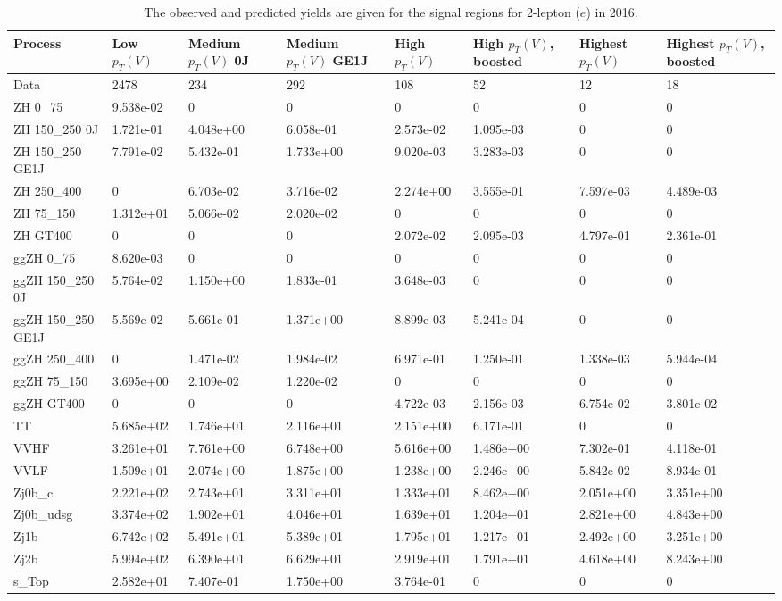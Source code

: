 \begin{table}
\centering
\caption[2016 2-lepton ($e$) signal selection yields]{
                  The observed and predicted yields are given for the
                  signal regions for 2-lepton ($e$) in 2016.
                  }
{\footnotesize
\begin{tabularx}{\textwidth}{|X|X|X|X|X|X|X|X|}
\hline
Process & Low $p_{T}(V)$ & Medium $p_{T}(V)$ 0J & Medium $p_{T}(V)$ GE1J & High $p_{T}(V)$ & High $p_{T}(V)$, boosted & Highest $p_{T}(V)$ & Highest $p_{T}(V)$, boosted \\
\hline
Data & 2478 & 234 & 292 & 108 & 52 & 12 & 18 \\
\hline
ZH 0\_75 & 9.538e-02 & 0 & 0 & 0 & 0 & 0 & 0 \\
ZH 150\_250 0J & 1.721e-01 & 4.048e+00 & 6.058e-01 & 2.573e-02 & 1.095e-03 & 0 & 0 \\
ZH 150\_250 GE1J & 7.791e-02 & 5.432e-01 & 1.733e+00 & 9.020e-03 & 3.283e-03 & 0 & 0 \\
ZH 250\_400 & 0 & 6.703e-02 & 3.716e-02 & 2.274e+00 & 3.555e-01 & 7.597e-03 & 4.489e-03 \\
ZH 75\_150 & 1.312e+01 & 5.066e-02 & 2.020e-02 & 0 & 0 & 0 & 0 \\
ZH GT400 & 0 & 0 & 0 & 2.072e-02 & 2.095e-03 & 4.797e-01 & 2.361e-01 \\
ggZH 0\_75 & 8.620e-03 & 0 & 0 & 0 & 0 & 0 & 0 \\
ggZH 150\_250 0J & 5.764e-02 & 1.150e+00 & 1.833e-01 & 3.648e-03 & 0 & 0 & 0 \\
ggZH 150\_250 GE1J & 5.569e-02 & 5.661e-01 & 1.371e+00 & 8.899e-03 & 5.241e-04 & 0 & 0 \\
ggZH 250\_400 & 0 & 1.471e-02 & 1.984e-02 & 6.971e-01 & 1.250e-01 & 1.338e-03 & 5.944e-04 \\
ggZH 75\_150 & 3.695e+00 & 2.109e-02 & 1.220e-02 & 0 & 0 & 0 & 0 \\
ggZH GT400 & 0 & 0 & 0 & 4.722e-03 & 2.156e-03 & 6.754e-02 & 3.801e-02 \\
\hline
TT & 5.685e+02 & 1.746e+01 & 2.116e+01 & 2.151e+00 & 6.171e-01 & 0 & 0 \\
VVHF & 3.261e+01 & 7.761e+00 & 6.748e+00 & 5.616e+00 & 1.486e+00 & 7.302e-01 & 4.118e-01 \\
VVLF & 1.509e+01 & 2.074e+00 & 1.875e+00 & 1.238e+00 & 2.246e+00 & 5.842e-02 & 8.934e-01 \\
Zj0b\_c & 2.221e+02 & 2.743e+01 & 3.311e+01 & 1.333e+01 & 8.462e+00 & 2.051e+00 & 3.351e+00 \\
Zj0b\_udsg & 3.374e+02 & 1.902e+01 & 4.046e+01 & 1.639e+01 & 1.204e+01 & 2.821e+00 & 4.843e+00 \\
Zj1b & 6.742e+02 & 5.491e+01 & 5.389e+01 & 1.795e+01 & 1.217e+01 & 2.492e+00 & 3.251e+00 \\
Zj2b & 5.994e+02 & 6.390e+01 & 6.629e+01 & 2.919e+01 & 1.791e+01 & 4.618e+00 & 8.243e+00 \\
s\_Top & 2.582e+01 & 7.407e-01 & 1.750e+00 & 3.764e-01 & 0 & 0 & 0 \\
\hline
\end{tabularx}
}
\label{tab:sr-Zee-2016}
\end{table}

